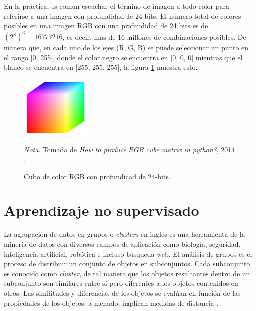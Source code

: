 En la práctica, es común escuchar el término de imagen a todo color para referirse a una imagen con profundidad de 24 bits. El número total de colores posibles en una imagen RGB con una profundidad de 24 bits es de $(2^8)^3 = 16 777 216$, es decir, más de 16 millones de combinaciones posibles. De manera que, en cada uno de los ejes (R, G, B) se puede seleccionar un punto en el rango [0, 255], donde el color negro se encuentra en [0, 0, 0] mientras que el blanco se encuentra en [255, 255, 255]\cite{gonzalez2009digital}, la figura \ref{fig:rgb_cube_colors} muestra esto.
\begin{figure}[h]
    \centering
    \includegraphics[width=0.3\textwidth]{Figures/Figures_Cap02/rgb_cube_colors.jpg}
    \caption{Cubo de color RGB con profundidad de 24-bits.}
    \textit{Nota}. Tomada de \textit{How to produce RGB cube matrix in python?}, 2014 \cite{stackoverflow}.
    \label{fig:rgb_cube_colors}
\end{figure}


\section{Aprendizaje no supervisado} \label{sec:aprendizaje_no_supervisado}

La agrupación de datos en grupos o \textit{clusters} en inglés es una herramienta de la minería de datos con diversos campos de aplicación como biología, seguridad, inteligencia artificial, robótica e incluso búsqueda web. El análisis de grupos es el proceso de distribuir un conjunto de objetos en subconjuntos. Cada subconjunto es conocido como \textit{cluster}, de tal manera que los objetos resultantes dentro de un subconjunto son similares entre sí pero diferentes a los objetos contenidos en otros. Las similitudes y diferencias de los objetos se evalúan en función de las propiedades de los objetos, a menudo, implican medidas de distancia \cite{han2011data}.


